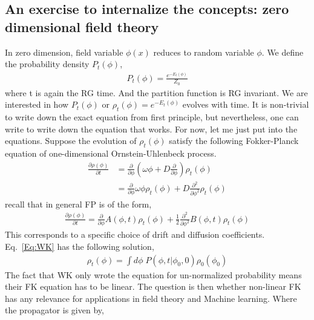 \documentclass[a4paper,11pt]{article}
\begin{document}
\subsection{An exercise to internalize the concepts: zero dimensional field theory}
In zero dimension, field variable $\phi(x)$ reduces to random variable $\phi$. We define the probability density $P_t(\phi)$,
\begin{equation}
\begin{split}
P_t(\phi)=\frac{e^{-E_t(\phi)}}{Z_0}
\end{split}
\end{equation}
where t is again the RG time. And the partition function is RG invariant. We are interested in how $P_t(\phi)$ or $\rho_t(\phi)=e^{-E_t(\phi)}$ evolves with time. It is non-trivial to write down the exact equation from first principle, but nevertheless, one can write to write down the equation that works. {\color{red}For now, let me just put into the equations}. Suppose the evolution of $\rho_t(\phi)$ satisfy the following Fokker-Planck equation of one-dimensional Ornstein-Uhlenbeck process. 
\begin{equation}
\begin{split}
\frac{\partial \rho(\phi)}{\partial t}&=\frac{\partial }{\partial \phi} (\omega \phi+ D\frac{\partial }{\partial \phi}) \rho_t(\phi) \\
&=\frac{\partial }{\partial \phi} \omega \phi \rho_t(\phi) +D \frac{\partial^2 }{\partial \phi^2} \rho_t(\phi) \label{Eq:WK}
\end{split}
\end{equation}
recall that in general FP is of the form,
\begin{equation}
\begin{split}
\frac{\partial \rho(\phi)}{\partial t}=\frac{\partial }{\partial \phi} A(\phi, t) \rho_t(\phi) +\frac{1}{2}\frac{\partial^2 }{\partial \phi^2} B(\phi,t) \rho_t(\phi)
\end{split}
\end{equation}
This corresponds to a specific choice of drift and diffusion coefficients. Eq.~\eqref{Eq:WK} has the following solution,
\begin{equation}
\begin{split}
\rho_t(\phi)=\int d\phi\; P(\phi, t | \phi_0,0) \rho_0(\phi_0)
\end{split}
\end{equation}
{\color{red} The fact that WK only wrote the equation for un-normalized probability means their FK equation has to be linear. The question is then whether non-linear FK has any relevance for applications in field theory and Machine learning.} Where the propagator is given by,
\end{document}
